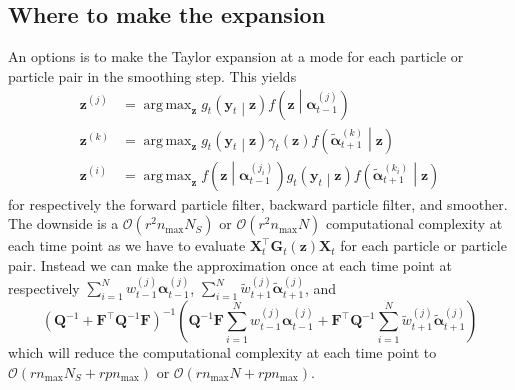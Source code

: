 \documentclass[notitlepage]{article}
\DeclareMathOperator*{\argmax}{arg\,max}
\renewcommand{\vec}[1]{\bm{#1}}
\newcommand{\mat}[1]{\mathbf{#1}}
\newcommand{\Lparen}[1]{\left( #1\right)}
\newcommand{\Cond}[2]{ #1 \middle\vert  #2}
\newcommand{\optor}[2]{#1\Lparen{#2}}
\newcommand{\optorC}[3]{\optor{#1}{\Cond{#2}{#3}}}
\newcommand{\gFunc}[3]{\optorC{g_{#3}}{#1}{#2}}
\newcommand{\fFunc}[2]{\optorC{f}{#1}{#2}}
\newcommand{\partic}[3]{#1_{#2}^{\Lparen{#3}}}
\newcommand{\particB}[3]{\widetilde{#1}_{#2}^{\Lparen{#3}}}
\newcommand{\bigO}[1]{\mathcal{O}\Lparen{#1}}
\newcommand{\dimState}{p}
\newcommand{\dimRng}{r}
\newcommand{\nPart}{N}
\newcommand{\nMax}{n_{\text{max}}}
\begin{document}
\subsection{Where to make the expansion}
An options is to make the Taylor expansion at a mode for each particle or particle pair in the smoothing step. This yields%
%
\begin{align*}
\vec z^{(j)} &= \argmax_{\vec z }
	\optorC{g_t}{\vec{y}_t}{\vec z}
	\optorC{f}{\vec z}{\partic{\vec\alpha}{t-1}j} \\
\vec z^{(k)} &= \argmax_{\vec z }
	\optorC{g_t}{\vec{y}_t}{\vec z}
	\gamma_t(\vec{z})
	\optorC{f}{\particB{\vec{\alpha}}{t + 1}k}{\vec z}\\
\vec z^{(i)} &= \argmax_{\vec z }
	\fFunc{\vec z}{\partic{\vec{\alpha}}{t - 1}{j_i}}
 	\gFunc{\vec{y}_t}{\vec z}{t}
 	\fFunc{\particB{\vec{\alpha}}{t + 1}{k_i}}{\vec z}
\end{align*}%
% 
for respectively the forward particle filter, backward particle filter, and smoother.
The downside is a $\bigO{\dimRng^2\nMax\nPart_S}$ or $\bigO{\dimRng^2\nMax\nPart}$ 
computational complexity at each time point 
as we have to evaluate $\mat X_t^\top \mat G_t(\vec z) \mat X_t$
for each particle or particle pair. Instead we can make the approximation 
once at each time point at 
respectively $\sum_{i=1}^\nPart \partic w{t-1}j\partic{\vec\alpha}{t-1}j$, %
$\sum_{i=1}^\nPart \particB w{t+1}j\particB{\vec\alpha}{t+1}j$, and %
%
$$
\Lparen{\mat Q^{-1} + \mat F^\top \mat Q^{-1}\mat F}^{-1}
\Lparen{\mat Q^{-1}\mat F\sum_{i=1}^\nPart \partic w{t-1}j\partic{\vec\alpha}{t-1}j + 
	\mat F^\top\mat Q^{-1}\sum_{i=1}^\nPart \particB w{t+1}j\particB{\vec\alpha}{t+1}j}
$$%
% 
which will reduce the computational complexity  at each time point to %
$\bigO{\dimRng\nMax\nPart_S + \dimRng\dimState\nMax}$ %
or $\bigO{\dimRng\nMax\nPart  + \dimRng\dimState\nMax}$. 
\end{document}
